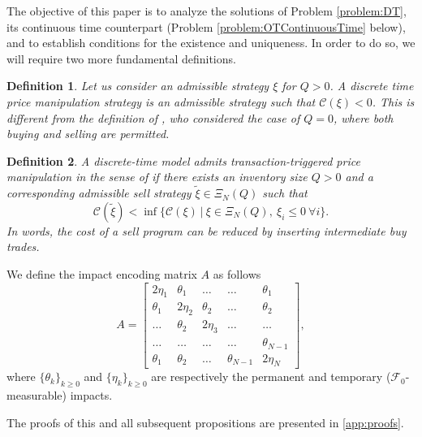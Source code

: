 \documentclass[final,3p,authoryear,12pt]{elsarticle}
\newtheorem{definition}{Definition}
\begin{document}
The objective of this paper is to analyze the solutions of Problem \eqref{problem:DT}, its continuous time counterpart (Problem \eqref{problem:OTContinuousTime} below), and to establish conditions for the existence and uniqueness. In order to do so, we will require two more fundamental definitions.


\begin{definition}
\label{definition:roundtrip}
Let us consider an admissible strategy $\xi$ for $Q > 0$. A discrete time price manipulation strategy is an admissible strategy such that $\mathcal{C}(\xi) < 0$. This is different from the definition of \cite{huberman2004price}, who considered the case of $Q=0$, where both buying and selling are permitted.
\end{definition}


\begin{definition}
\label{definition:TTPM}
A discrete-time model admits transaction-triggered price manipulation in the sense of
\cite{alfonsi2010optimal} if there exists an inventory size $Q>0$ and a
corresponding admissible sell strategy $\tilde{\xi}\in\Xi_N(Q)$ such that
\[
\mathcal{C}(\tilde{\xi}) <
\inf\Big\{ \mathcal{C}(\xi)\ \big|\ \xi\in\Xi_N(Q),\ \xi_i \le 0\ \forall i\Big\}.
\]
In words, the cost of a sell program can be reduced by inserting intermediate
buy trades.
\end{definition}


\medskip 
We define the impact encoding matrix \(A\) as follows 
\begin{equation}
\label{eq:encoding_matrix}
    A = \begin{bmatrix}
                2\eta_{1} & \theta_{1} & \dots & \dots & \theta_{1}\\
                \theta_{1} & 2\eta_{2} & \theta_{2} & \dots & \theta_{2} \\
                \dots & \theta_{2} & 2\eta_{3} & \dots & \dots \\
                \dots & \dots & \dots & \dots & \theta_{N-1} \\
                \theta_{1} & \theta_{2} & \dots & \theta_{N-1} & 2\eta_{N} 
                \end{bmatrix},
\end{equation}
where \(\{\theta_k\}_{k \ge 0}\) and \(\{\eta_{k}\}_{k \ge 0}\) are respectively the permanent and temporary (\(\mathcal{F}_0\)-measurable) impacts. 

The proofs of this and all subsequent propositions are presented in \ref{app:proofs}.
\end{document}
